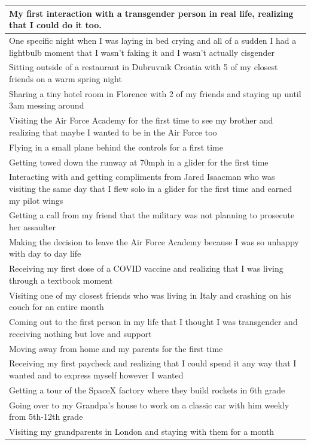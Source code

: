 \documentclass[
  .7em,
  letterpaper,
  DIV=11,
  numbers=noendperiod]{scrartcl}
\begin{document}
\begin{table}
\begin{tabular}{l}
\hline
My first interaction with a transgender person in real life, realizing that I could do it too.\\
\hline
One specific night when I was laying in bed crying and all of a sudden I had a lightbulb moment that I wasn't faking it and I wasn't actually cisgender\\
\hline
Sitting outside of a restaurant in Dubruvnik Croatia with 5 of my closest friends on a warm spring night\\
\hline
Sharing a tiny hotel room in Florence with 2 of my friends and staying up until 3am messing around\\
\hline
Visiting the Air Force Academy for the first time to see my brother and realizing that maybe I wanted to be in the Air Force too\\
\hline
Flying in a small plane behind the controls for a first time\\
\hline
Getting towed down the runway at 70mph in a glider for the first time\\
\hline
Interacting with and getting compliments from Jared Isaacman who was visiting the same day that I flew solo in a glider for the first time and earned my pilot wings\\
\hline
Getting a call from my friend that the military was not planning to prosecute her assaulter\\
\hline
Making the decision to leave the Air Force Academy because I was so unhappy with day to day life\\
\hline
Receiving my first dose of a COVID vaccine and realizing that I was living through a textbook moment\\
\hline
Visiting one of my closest friends who was living in Italy and crashing on his couch for an entire month\\
\hline
Coming out to the first person in my life that I thought I was transgender and receiving nothing but love and support\\
\hline
Moving away from home and my parents for the first time\\
\hline
Receiving my first paycheck and realizing that I could spend it any way that I wanted and to express myself however I wanted\\
\hline
Getting a tour of the SpaceX factory where they build rockets in 6th grade\\
\hline
Going over to my Grandpa's house to work on a classic car with him weekly from 5th-12th grade\\
\hline
Visiting my grandparents in London and staying with them for a month\\

\end{tabular}
\end{table}
\end{document}
